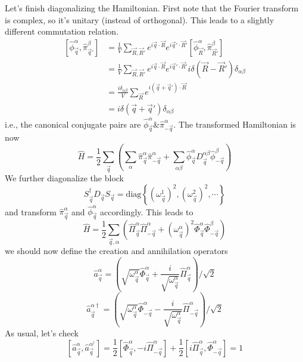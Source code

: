 Let's finish diagonalizing the Hamiltonian. First note that the Fourier transform is complex, so it's unitary (instead of orthogonal). This leads to a slightly different commutation relation.
\begin{align*}
    \left[ \hat{\phi}_{\vec{q}}^{\alpha},\hat{\pi}_{\vec{q}'}^{\beta} \right] &=\frac{1}{V}\sum_{\vec{R},\vec{R}'}{e^{i\vec{q}\cdot \vec{R}}e^{i\vec{q}'\cdot \vec{R}'}\left[ \hat{\phi}_{\vec{R}}^{\alpha},\hat{\pi}_{\vec{R}'}^{\beta} \right]}\\
    &=\frac{1}{V}\sum_{\vec{R},\vec{R}'}{e^{i\vec{q}\cdot \vec{R}}e^{i\vec{q}'\cdot \vec{R}'}i\delta \left( \vec{R}-\vec{R}' \right) \delta _{\alpha \beta}}\\
    &=\frac{i\delta _{\alpha \beta}}{V}\sum_{\vec{R}}{e^{i\left( \vec{q}+\vec{q}' \right) \cdot \vec{R}}}\\
    &=i\delta \left( \vec{q}+\vec{q}' \right) \delta _{\alpha \beta}
\end{align*}
i.e., the canonical conjugate pairs are $\hat{\phi}_{\vec{q}}^\alpha \& \hat{\pi}_{-\vec{q}}^\alpha$. The transformed Hamiltonian is now
\[ \hat{H}=\frac{1}{2}\sum_{\vec{q}}{\left( \sum_{\alpha}{\hat{\pi}_{\vec{q}}^{\alpha}\hat{\pi}_{-\vec{q}}^{\alpha}}+\sum_{\alpha \beta}{\hat{\phi}_{\vec{q}}^{\alpha}D_{\vec{q}}^{\alpha \beta}\hat{\phi}_{-\vec{q}}^{\beta}} \right)}\]
We further diagonalize the block
\[ S_{\vec{q}}^{\dagger}D_{\vec{q}}S_{\vec{q}}=\mathrm{diag}\left\{ \left( \omega _{\vec{q}}^{1} \right) ^2,\left( \omega _{\vec{q}}^{2} \right) ^2,\cdots \right\} \]
and transform $\hat{\pi}_{\vec{q}}^\alpha$ and $\hat{\phi}_{\vec{q}}^\alpha$ accordingly. This leads to
\[ \hat{H}=\frac{1}{2}\sum_{\vec{q},\alpha}{\left( \hat{\Pi}_{\vec{q}}^{\alpha}\hat{\Pi}_{-\vec{q}}^{\alpha}+\left( \omega _{\vec{q}}^{\alpha} \right) ^2\hat{\Phi}_{\vec{q}}^{\alpha}\hat{\Phi}_{-\vec{q}}^{\beta} \right)}\]
we should now define the creation and annihilation operators
\[ \hat{a}_{\vec{q}}^{\alpha}=\left( \sqrt{\omega _{\vec{q}}^{\alpha}}\hat{\Phi}_{\vec{q}}^{\alpha}+\frac{i}{\sqrt{\omega _{\vec{q}}^{\alpha}}}\hat{\Pi}_{\vec{q}}^{\alpha} \right) /\sqrt{2}\]
\[ \hat{a}_{\vec{q}}^{\alpha \dagger}=\left( \sqrt{\omega _{\vec{q}}^{\alpha}}\hat{\Phi}_{-\vec{q}}^{\alpha}-\frac{i}{\sqrt{\omega _{\vec{q}}^{\alpha}}}\hat{\Pi}_{-\vec{q}}^{\alpha} \right) /\sqrt{2} \]
As usual, let's check
\[ \left[ \hat{a}_{\vec{q}}^{\alpha},\hat{a}_{\vec{q}}^{\alpha ^{\dagger}} \right] =\frac{1}{2}\left[ \hat{\Phi}_{\vec{q}}^{\alpha},-i\hat{\Pi}_{-\vec{q}}^{\alpha} \right] +\frac{1}{2}\left[ i\hat{\Pi}_{\vec{q}}^{\alpha},\hat{\Phi}_{-\vec{q}}^{\alpha} \right] =1\]
